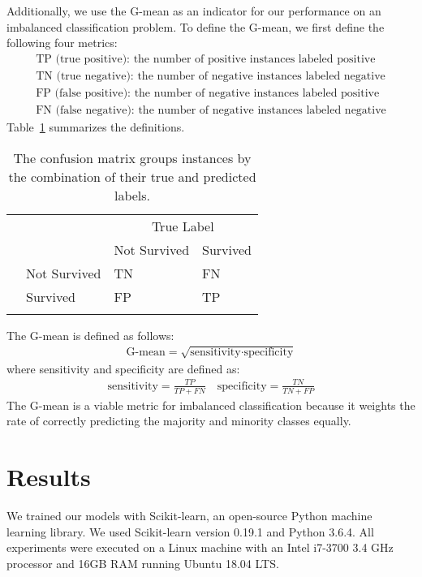 \documentclass[review]{elsarticle}
\newcommand*\rot{\rotatebox{90}}
\begin{document}
Additionally, we use the G-mean as an indicator for our performance on an imbalanced classification problem. To define the G-mean, we first define the following four metrics:
\begin{align*}
\text{TP (true positive): the number of positive instances labeled positive}\\
\text{TN (true negative): the number of negative instances labeled negative}\\
\text{FP (false positive): the number of negative instances labeled positive}\\
\text{FN (false negative): the number of negative instances labeled negative}
\end{align*} 
Table~\ref{confusion-matrix} summarizes the definitions.
\begin{table}[H]
	\centering
	\begin{tabular}{llll}
		&                                   & \multicolumn{2}{c}{True Label}                     \\ 
		\cline{3-4}
		&                                   & Not Survived            & Survived                 \\ 
		\cline{3-4}
		\multirow{2}{*}{\rot{Predicted}} & \multicolumn{1}{|l|}{Not Survived} & \multicolumn{1}{l|}{TN} & \multicolumn{1}{l|}{FN}  \\ 
		\cline{3-4}
		\multicolumn{1}{l}{}                & \multicolumn{1}{|l|}{Survived}     & \multicolumn{1}{l|}{FP} & \multicolumn{1}{l|}{TP}  \\ 
		\cline{3-4}
		&                                   &                         &                         
	\end{tabular}
	\caption{The confusion matrix groups instances by the combination of their true and predicted labels.}
	\label{confusion-matrix}
\end{table}
\noindent The G-mean is defined as follows:
\begin{align*}
	\text{G-mean} = \sqrt{\text{sensitivity}\cdot\text{specificity}}
\end{align*}
where sensitivity and specificity are defined as:
\begin{align*}
\text{sensitivity} = \frac{TP}{TP + FN} \quad\text{specificity} = \frac{TN}{TN + FP}
\end{align*}
 The G-mean is a viable metric for imbalanced classification because it weights the rate of correctly predicting the majority and minority classes equally.
\section{Results}
We trained our models with Scikit-learn, an open-source Python machine learning library. We used Scikit-learn version 0.19.1 and Python 3.6.4. All experiments were executed on a Linux machine with an Intel i7-3700 3.4 GHz processor and 16GB RAM running Ubuntu 18.04 LTS.
\end{document}
